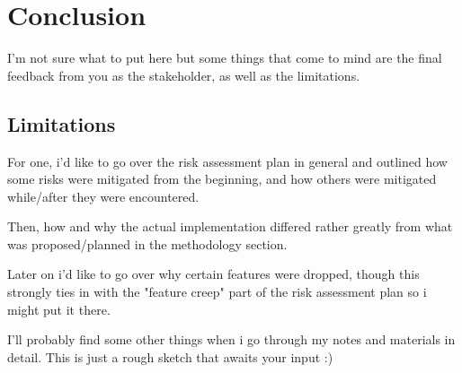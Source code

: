 \chapter{Conclusion}
\label{sec:conclusion}

I'm not sure what to put here but some things that come to mind are the final feedback from you as the stakeholder, as well as the limitations.

\section{Limitations}

For one, i'd like to go over the risk assessment plan in general and outlined how some risks were mitigated from the beginning, and how others were mitigated while/after they were encountered.

Then, how and why the actual implementation differed rather greatly from what was proposed/planned in the methodology section.

Later on i'd like to go over why certain features were dropped, though this strongly ties in with the "feature creep" part of the risk assessment plan so i might put it there.

I'll probably find some other things when i go through my notes and materials in detail. This is just a rough sketch that awaits your input :)